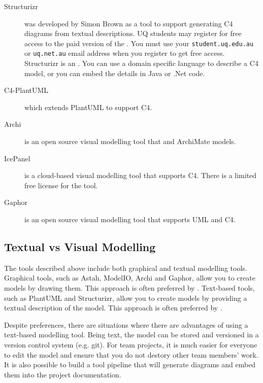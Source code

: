 \begin{description}
    \item[Structurizr]
        was developed by Simon Brown as a tool to support generating C4 diagrams from textual descriptions.
        UQ students may register for free access to the paid version of the .
        You must use your \texttt{student.uq.edu.au} or \texttt{uq.net.au} email address when you register to get free access.
        Structurizr is an .
        You can use a domain specific language to describe a C4 model, or you can embed the details in Java or .Net code.
    \item[C4-PlantUML] which extends PlantUML to support C4.
    \item[Archi] is an open source visual modelling tool that
         and ArchiMate models.
    \item[IcePanel] is a cloud-based visual modelling tool that supports C4. There is a limited free license for the tool.
    \item[Gaphor] is an open source visual modelling tool that supports UML and C4.
\end{description}

\subsection{Textual vs Visual Modelling}
The tools described above include both graphical and textual modelling tools.
Graphical tools, such as Astah, ModelIO, Archi and Gaphor, allow you to create models by drawing them.
This approach is often preferred by .
Text-based tools, such as PlantUML and Structurizr, allow you to create models by providing a textual description of the model.
This approach is often preferred by .

Despite preferences, there are situations where there are advantages of using a text-based modelling tool.
Being text, the model can be stored and versioned in a version control system (e.g. git).
For team projects, it is much easier for everyone to edit the model and ensure that you do not destory other team members' work.
It is also possible to build a tool pipeline that will generate diagrams and embed them into the project documentation.

